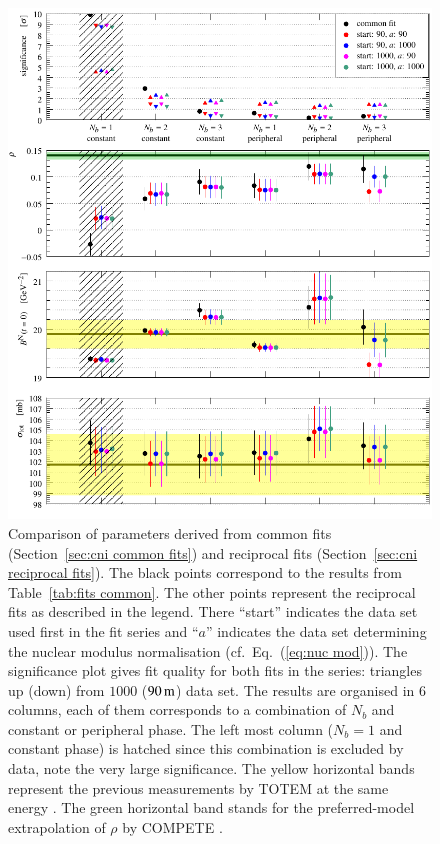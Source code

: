 \begin{figure}
\begin{center}
\includegraphics{fig/fits_reciprocal_derived.pdf}
\caption{%
Comparison of parameters derived from common fits (Section~\ref{sec:cni common fits}) and reciprocal fits (Section~\ref{sec:cni reciprocal fits}). The black points correspond to the results from Table~\ref{tab:fits common}. The other points represent the reciprocal fits as described in the legend. There ``start'' indicates the data set used first in the fit series and ``$a$'' indicates the data set determining the nuclear modulus normalisation (cf.~Eq.~(\ref{eq:nuc mod})). The significance plot gives fit quality for both fits in the series: triangles up (down) from $1000$ ($90\,{\rm m}$) data set. The results are organised in 6 columns, each of them corresponds to a combination of $N_b$ and constant or peripheral phase. The left most column ($N_b = 1$ and constant phase) is hatched since this combination is excluded by data, note the very large significance. The yellow horizontal bands represent the previous measurements by TOTEM at the same energy \cite{prl111}. The green horizontal band stands for the preferred-model extrapolation of $\rho$ by COMPETE \cite{compete}.
}
\label{fig:fits reciprocal der}
\end{center}
\end{figure}

